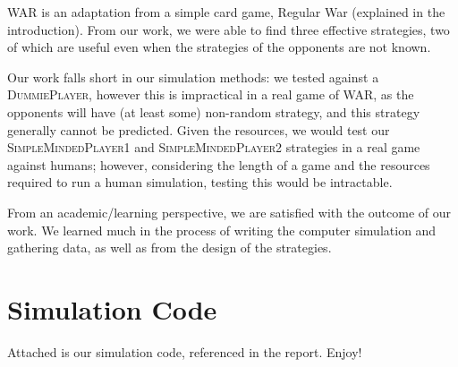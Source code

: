 \documentclass[conference]{IEEEtran}
\newcommand\DP{\textsc{DummiePlayer}}
\newcommand\SMPo{\textsc{SimpleMindedPlayer1}}
\newcommand\SMPt{\textsc{SimpleMindedPlayer2}}
\begin{document}
WAR is an adaptation from a simple card game, Regular War (explained in the
introduction). From our work, we were able to find three effective strategies,
two of which are useful even when the strategies of the opponents are not
known.

Our work falls short in our simulation methods: we tested against a \DP{},
however this is impractical in a real game of WAR, as the opponents will have
(at least some) non-random strategy, and this strategy generally cannot be
predicted. Given the resources, we would test our \SMPo{} and \SMPt{}
strategies in a real game against humans; however, considering the length of a
game and the resources required to run a human simulation, testing this would
be intractable.

From an academic/learning perspective, we are satisfied with the outcome of our
work. We learned much in the process of writing the computer simulation and
gathering data, as well as from the design of the strategies.

\clearpage
\onecolumn
\appendix

\section{Simulation Code}
\label{sec:code}

Attached is our simulation code, referenced in the report. Enjoy!

\inputminted[linenos]{python3}{../war.py}
\end{document}
